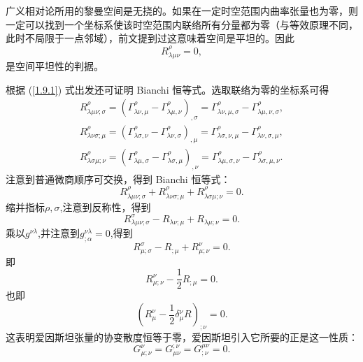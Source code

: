 \documentclass[11pt, a4paper, oneside, onecolumn]{ctexart}
\numberwithin{equation}{subsection}
\begin{document}
广义相对论所用的黎曼空间是无挠的。如果在一定时空范围内曲率张量也为零，则一定可以找到一个坐标系使该时空范围内联络所有分量都为零（与等效原理不同，此时不局限于一点邻域），前文提到过这意味着空间是平坦的。因此
\begin{equation}
R_{\lambda\mu\nu}^{\rho}=0,
\end{equation}
是空间平坦性的判据。

根据 (\ref{1.9.1}) 式出发还可证明 Bianchi 恒等式。选取联络为零的坐标系可得
\begin{align}
R^{\rho}_{\lambda\mu\nu;\sigma}=\left(\Gamma^{\rho}_{\lambda\nu,\mu}-\Gamma_{\lambda\mu,\nu}^{\rho}\right)_{,\sigma}=\Gamma^{\rho}_{\lambda\nu,\mu,\sigma}-\Gamma^{\rho}_{\lambda\mu,\nu,\sigma},\\
R^{\rho}_{\lambda\nu\sigma;\mu}=\left(\Gamma^{\rho}_{\lambda\sigma,\nu}-\Gamma_{\lambda\nu,\sigma}^{\rho}\right)_{,\mu}=\Gamma^{\rho}_{\lambda\sigma,\nu,\mu}-\Gamma^{\rho}_{\lambda\nu,\sigma,\mu},\\
R^{\rho}_{\lambda\sigma\mu;\nu}=\left(\Gamma^{\rho}_{\lambda\mu,\sigma}-\Gamma_{\lambda\sigma,\mu}^{\rho}\right)_{,\nu}=\Gamma^{\rho}_{\lambda\mu,\sigma,\nu}-\Gamma^{\rho}_{\lambda\sigma,\mu,\nu}.
\end{align}
注意到普通微商顺序可交换，得到 Bianchi 恒等式：
\begin{equation}
R^{\rho}_{\lambda\mu\nu;\sigma}+R^{\rho}_{\lambda\nu\sigma;\mu}+R^{\rho}_{\lambda\sigma\mu;\nu}=0.
\end{equation}
缩并指标$\rho,\sigma$,注意到反称性，得到
\begin{equation}
R^{\sigma}_{\lambda\mu\nu;\sigma}-R_{\lambda\nu;\mu}+R_{\lambda\mu;\nu}=0.
\end{equation}
乘以$g^{\nu\lambda}$,并注意到$g^{\nu\lambda}_{;\alpha}=0$,得到
\begin{equation}
R^{\sigma}_{\mu;\sigma}-R_{;\mu}+R^{\nu}_{\mu;\nu}=0.
\end{equation}
即
\begin{equation}
R^{\nu}_{\mu;\nu}-\frac12R_{;\mu}=0.
\end{equation}
也即
\begin{equation}
\left(R^{\nu}_{\mu}-\frac12\delta{}_{\mu}^{\nu}R\right)_{;\nu}=0.
\end{equation}
这表明爱因斯坦张量的协变散度恒等于零，爱因斯坦引入它所要的正是这一性质：
\begin{equation}
G_{\mu;\nu}^{\nu}=G_{\mu\nu}^{;\nu}=G^{\mu\nu}_{;\nu}=0.
\end{equation}
\end{document}
